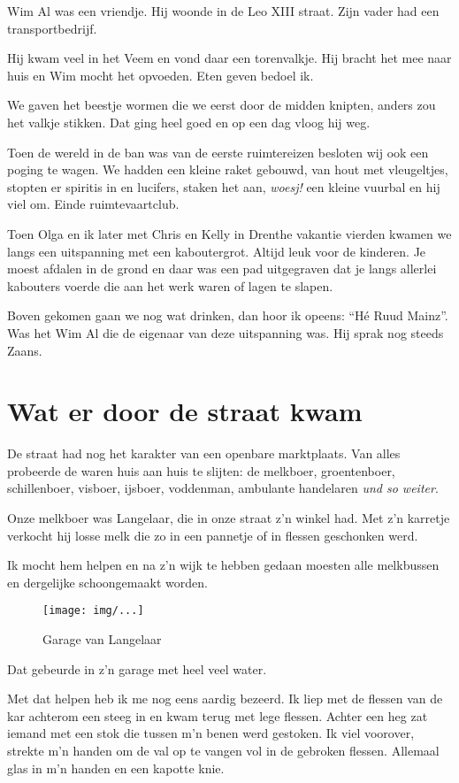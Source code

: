 \documentclass[10pt,twoside,openright]{memoir}
\begin{document}
Wim Al was een vriendje. Hij woonde in de Leo XIII straat. Zijn vader had een transportbedrijf. 

Hij kwam veel in het Veem en vond daar een torenvalkje. Hij bracht het mee naar huis en Wim mocht het opvoeden. Eten geven bedoel ik. 

We gaven het beestje wormen die we eerst door de midden knipten, anders zou het valkje stikken. Dat ging heel goed en op een dag vloog hij weg.

Toen de wereld in de ban was van de eerste ruimtereizen besloten wij ook een poging te wagen. We hadden een kleine raket gebouwd, van hout met vleugeltjes, stopten er spiritis in en lucifers, staken het aan, \emph{woesj!} een kleine vuurbal en hij viel om. Einde ruimtevaartclub.

Toen Olga en ik later met Chris en Kelly in Drenthe vakantie vierden kwamen we langs een uitspanning met een kaboutergrot. Altijd leuk voor de kinderen. Je moest afdalen in de grond en daar was een pad uitgegraven dat je langs allerlei kabouters voerde die aan het werk waren of lagen te slapen. 

Boven gekomen gaan we nog wat drinken, dan hoor ik opeens: ``Hé Ruud Mainz''. Was het Wim Al die de eigenaar van deze uitspanning was. Hij sprak nog steeds Zaans.

\chapter{Wat er door de straat kwam} %
\label{cha:straat}

De straat had nog het karakter van een openbare marktplaats. Van alles probeerde de waren huis aan huis te slijten: de melkboer, groentenboer, schillenboer, visboer, ijsboer, voddenman, ambulante handelaren \emph{und so weiter}. 

Onze melkboer was Langelaar, die in onze straat z’n winkel had. Met z’n karretje verkocht hij losse melk die zo in een pannetje of in flessen geschonken werd. 

Ik mocht hem helpen en na z’n wijk te hebben gedaan moesten alle melkbussen en dergelijke schoongemaakt worden. 

\begin{figure}[t]
\texttt{[image: img/...]}
\caption{Garage van Langelaar}
\end{figure}

Dat gebeurde in z’n garage met heel veel water. 

Met dat helpen heb ik me nog eens aardig bezeerd. Ik liep met de flessen van de kar achterom een steeg in en kwam terug met lege flessen. Achter een heg zat iemand met een stok die tussen m’n benen werd gestoken. Ik viel voorover, strekte m'n handen om de val op te vangen vol in de gebroken flessen. Allemaal glas in m'n handen en een kapotte knie.
\end{document}
